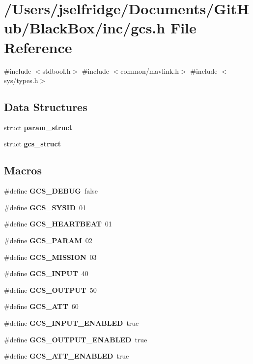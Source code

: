 \section{/\+Users/jselfridge/\+Documents/\+Git\+Hub/\+Black\+Box/inc/gcs.h File Reference}
\label{gcs_8h}
{\ttfamily \#include $<$stdbool.\+h$>$}\newline
{\ttfamily \#include $<$common/mavlink.\+h$>$}\newline
{\ttfamily \#include $<$sys/types.\+h$>$}\newline
\subsection*{Data Structures}
\begin{DoxyCompactItemize}
\item 
struct \textbf{ param\+\_\+struct}
\item 
struct \textbf{ gcs\+\_\+struct}
\end{DoxyCompactItemize}
\subsection*{Macros}
\begin{DoxyCompactItemize}
\item 
\#define \textbf{ G\+C\+S\+\_\+\+D\+E\+B\+UG}~false
\item 
\#define \textbf{ G\+C\+S\+\_\+\+S\+Y\+S\+ID}~01
\item 
\#define \textbf{ G\+C\+S\+\_\+\+H\+E\+A\+R\+T\+B\+E\+AT}~01
\item 
\#define \textbf{ G\+C\+S\+\_\+\+P\+A\+R\+AM}~02
\item 
\#define \textbf{ G\+C\+S\+\_\+\+M\+I\+S\+S\+I\+ON}~03
\item 
\#define \textbf{ G\+C\+S\+\_\+\+I\+N\+P\+UT}~40
\item 
\#define \textbf{ G\+C\+S\+\_\+\+O\+U\+T\+P\+UT}~50
\item 
\#define \textbf{ G\+C\+S\+\_\+\+A\+TT}~60
\item 
\#define \textbf{ G\+C\+S\+\_\+\+I\+N\+P\+U\+T\+\_\+\+E\+N\+A\+B\+L\+ED}~true
\item 
\#define \textbf{ G\+C\+S\+\_\+\+O\+U\+T\+P\+U\+T\+\_\+\+E\+N\+A\+B\+L\+ED}~true
\item 
\#define \textbf{ G\+C\+S\+\_\+\+A\+T\+T\+\_\+\+E\+N\+A\+B\+L\+ED}~true
\end{DoxyCompactItemize}
